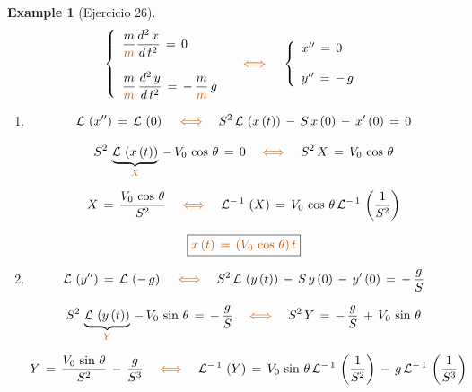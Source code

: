 \documentclass[a4paper,11pt,openany]{book}
\newtheorem{exmp}{Example}[section]
\newcommand*{\itembolasazules}[1]{%
\footnotesize\protect\tikz[baseline=-3pt]%
\protect\node[scale=.7, circle, shade, ball
color=green]{\color{white}\Large\bf#1};}
\begin{document}
\newpage
 
\begin{exmp}[Ejercicio 26]
 
 
$$\left\{
\begin{array}{ll}
\dfrac{m}{\textcolor{burntorange}{m}} \dfrac{d^{2}\,x}{d\,t^{2}}\,=\,0 \\ \\
\dfrac{m}{\textcolor{burntorange}{m}}\,\dfrac{d^{2}\,y}{d\,t^{2}}\,=\,-\,\dfrac{m}{\textcolor{burntorange}{m}}\,g
\end{array}
\right. \quad \textcolor{burntorange}{\iff} \quad \left\{
\begin{array}{ll}
x''\,=\,0 \\ \\
y''\,=\,-\,g
\end{array}
\right. $$
 
\begin{enumerate}[label=\itembolasazules{\arabic*}]
 
\item $$\mathcal{L}\,\left(x'' \right)\,=\,\mathcal{L}\,\left(0 \right) \quad \textcolor{burntorange}{\iff} \quad S^{2}\,\mathcal{L}\,\left(x\,(t) \right)\,-\,S\,x\,(0)\,-\,x'\,(0)\,=\,0 $$
 
$$S^{2}\,\underbrace{\mathcal{L}\,\left(x\,(t) \right)}_{\textcolor{burntorange}{X} }\,-\,V_{0}\,\cos\,\theta\,=\,0 \quad \textcolor{burntorange}{\iff} \quad S^{2}\,X\,=\,V_{0}\,\cos\,\theta$$
 
$$X\,=\,\dfrac{V_{0}\,\cos\,\theta}{S^{2}} \quad \textcolor{burntorange}{\iff} \quad \mathcal{L}^{-\,1}\,\left(X \right)\,=\,V_{0}\,\cos\,\theta\,\mathcal{L}^{-\,1}\,\left(\dfrac{1}{S^{2}
} \right)$$
 
$$\boxed{\textcolor{burntorange}{x\,(t)\,=\,(V_{0}\,\cos\,\theta)\,t } } $$
 
\item $$\mathcal{L}\,\left(y'' \right)\,=\,\mathcal{L}\,\left(-\,g \right) \quad \textcolor{burntorange}{\iff} \quad S^{2}\,\mathcal{L}\,\left(y\,(t) \right)\,-\,S\,y\,(0)\,-\,y'\,(0)\,=\,-\,\dfrac{g}{S} $$
 
$$S^{2}\,\underbrace{\mathcal{L}\,\left(y\,(t) \right)}_{\textcolor{burntorange}{Y} }\,-\,V_{0}\,\sin\,\theta\,=\,-\,\dfrac{g}{S} \quad \textcolor{burntorange}{\iff} \quad S^{2}\,Y\,=\,-\,\dfrac{g}{S}\,+\,V_{0}\,\sin\,\theta$$
 
$$Y\,=\,\dfrac{V_{0}\,\sin\,\theta}{S^{2}}\,-\,\dfrac{g}{S^{3}} \quad \textcolor{burntorange}{\iff} \quad \mathcal{L}^{-\,1}\,\left(Y \right)\,=\,V_{0}\,\sin\,\theta\,\mathcal{L}^{-\,1}\,\left(\dfrac{1}{S^{2}} \right)\,-\,g\,\mathcal{L}^{-\,1}\,\left(\dfrac{1}{S^{3}} \right) $$
 

\end{enumerate}
\end{exmp}
\end{document}
